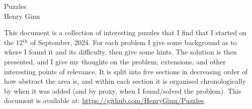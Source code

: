\documentclass[hidelinks, 11 pt]{article}
\begin{document}
\newpage
\setcounter{page}{1}
\addtolength{\topmargin}{-1.6pt}
\thispagestyle{firstpage}

\begin{center}
    \vspace*{-20mm}
    \Huge Puzzles  \\
    \vspace{5mm}
    \large Henry Ginn  \\
\end{center}
\vspace{5mm}

This document is a collection of interesting puzzles that I find that I started on the 12$^\text{th}$ of September, 2024. For each problem I give some background as to where I found it and its difficulty, then give some hints. The solution is then presented, and I give my thoughts on the problem, extensions, and other interesting points of relevance. It is split into five sections in decreasing order of how abstract the area is, and within each section it is organised chronologically by when it was added (and by proxy, when I found/solved the problem). This document is available at: \url{https://github.com/HenryGinn/Puzzles}.

\tableofcontents

\renewcommand{\contentsname}{}

\newpage

\newpage
\newpage
\newpage
\newpage
\newpage

\newpage


\fancyhf{}
\fancyhead[R]{}
\fancyfoot[C]{\thepage}



\end{document}
